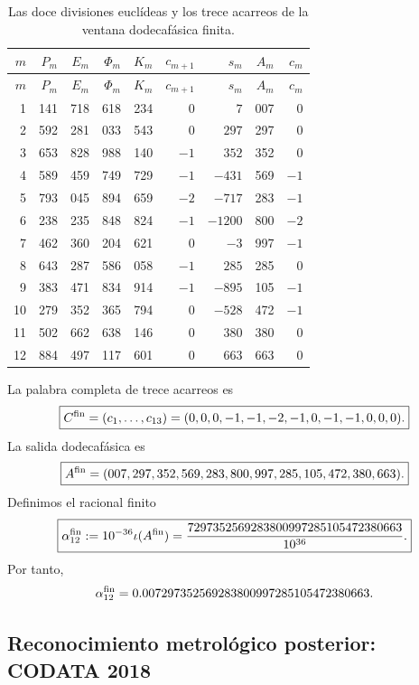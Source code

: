 \begingroup
\scriptsize
\setlength{\tabcolsep}{3.2pt}
\begin{longtable}{@{}r|rrrr|r|r|r|r@{}}
\caption{Las doce divisiones euclídeas y los trece acarreos de la ventana
dodecafásica finita.}
\label{p12-83-c10-s2:tab:acarreo-alpha-finito-autonomo}\\
\toprule
\(m\)&\(P_m\)&\(E_m\)&\(\Phi_m\)&\(K_m\)&
\(c_{m+1}\)&\(s_m\)&\(A_m\)&\(c_m\)\\
\midrule
\endfirsthead
\toprule
\(m\)&\(P_m\)&\(E_m\)&\(\Phi_m\)&\(K_m\)&
\(c_{m+1}\)&\(s_m\)&\(A_m\)&\(c_m\)\\
\midrule
\endhead
1  &141&718&618&234& \(0\)& \(7\)&007& \(0\)\\
2  &592&281&033&543& \(0\)& \(297\)&297& \(0\)\\
3  &653&828&988&140& \(-1\)& \(352\)&352& \(0\)\\
4  &589&459&749&729& \(-1\)& \(-431\)&569& \(-1\)\\
5  &793&045&894&659& \(-2\)& \(-717\)&283& \(-1\)\\
6  &238&235&848&824& \(-1\)& \(-1200\)&800& \(-2\)\\
7  &462&360&204&621& \(0\)& \(-3\)&997& \(-1\)\\
8  &643&287&586&058& \(-1\)& \(285\)&285& \(0\)\\
9  &383&471&834&914& \(-1\)& \(-895\)&105& \(-1\)\\
10 &279&352&365&794& \(0\)& \(-528\)&472& \(-1\)\\
11 &502&662&638&146& \(0\)& \(380\)&380& \(0\)\\
12 &884&497&117&601& \(0\)& \(663\)&663& \(0\)\\
\bottomrule
\end{longtable}
\endgroup

La palabra completa de trece acarreos es
\[
 \boxed{
 C^{\rm fin}
 =(c_1,\ldots,c_{13})
 =(0,0,0,-1,-1,-2,-1,0,-1,-1,0,0,0).}
\]
La salida dodecafásica es
\[
 \boxed{
 A^{\rm fin}
 =(007,297,352,569,283,800,997,285,105,472,380,663).}
\]
Definimos el racional finito
\begin{equation}
 \boxed{
 \alpha_{12}^{\rm fin}
 :=10^{-36}\iota(A^{\rm fin})
 =\frac{7297352569283800997285105472380663}{10^{36}}.}
 \label{p12-83-c10-s2:eq:alpha-finita-autonoma}
\end{equation}
Por tanto,
\[
 \alpha_{12}^{\rm fin}
 =0.007297352569283800997285105472380663.
\]

\subsection{Reconocimiento metrológico posterior: CODATA 2018}

